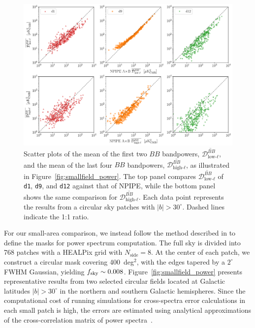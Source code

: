 \documentclass[twocolumn]{aastex631}
\begin{document}
\begin{figure}
    \centering
    \includegraphics[width=2.1\columnwidth]{figures/llmean_hlmean_comparison.pdf}
    \caption{Scatter plots of the mean of the first two $BB$ bandpowers, $\overline{\mathcal{D}_{\text{low-}\ell}^{BB}}$, and the mean of the last four $BB$ bandpowers, $\overline{\mathcal{D}_{\text{high-}\ell}^{BB}}$, as illustrated in Figure~\ref{fig:smallfield_power}. The top panel compares $\overline{\mathcal{D}_{\text{low-}\ell}^{BB}}$ of \texttt{d1}, \texttt{d9}, and \texttt{d12} against that of NPIPE, while the bottom panel shows the same comparison for $\overline{\mathcal{D}_{\text{high-}\ell}^{BB}}$. Each data point represents the results from a circular sky patches with $|b| > 30^\circ$. Dashed lines indicate the 1:1 ratio.}
    \label{fig:smallfield_power_all}
\end{figure}

For our small-area comparison, we instead follow the method described in \cite{planck2014-XXX} to define the masks for power spectrum computation. The full sky is divided into 768 patches with a HEALPix grid with $N_\text{side} = 8$. At the center of each patch, we construct a circular mask covering 400~deg$^2$, with the edges tapered by a $2^\circ$ FWHM Gaussian, yielding $f_{\rm sky} \sim 0.008$. Figure~\ref{fig:smallfield_power} presents representative results from two selected circular fields located at Galactic latitudes $|b| > 30^\circ$ in the northern and southern Galactic hemispheres. Since the computational cost of running simulations for cross-spectra error calculations in each small patch is high, the errors are estimated using analytical approximations of the cross-correlation matrix of power spectra~\citep{Tristram:2005}.
\end{document}
